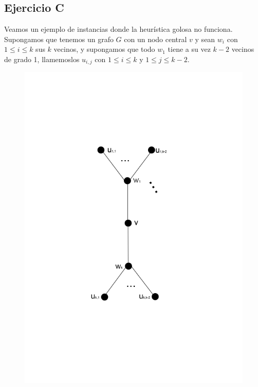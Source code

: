\subsection{Ejercicio C}

Veamos un ejemplo de instancias donde la heurística golosa no funciona. Supongamos que tenemos un grafo $G$ con un nodo central $v$ y sean $w_i$ con $1 \leq i \leq k$ sus $k$ vecinos, y supongamos que todo $w_1$ tiene a su vez $k-2$ vecinos de grado 1, llamemoslos $u_{i,j}$ con $1 \leq i \leq k$ y $1 \leq j \leq k-2$. \\ 

\begin{figure}[h]
\begin{center}
\includegraphics[scale=0.5]{imagenes/grafos-ej3-tp3-1.png}
\end{center}
\end{figure}


